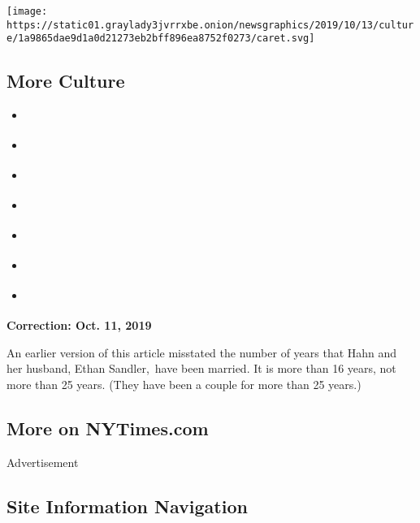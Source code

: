 \protect\hyperlink{}{} \protect\hyperlink{}{}

\texttt{[image: https://static01.graylady3jvrrxbe.onion/newsgraphics/2019/10/13/culture/1a9865dae9d1a0d21273eb2bff896ea8752f0273/caret.svg]}

\hypertarget{more-culture}{%
\subsection{More Culture}\label{more-culture}}

\begin{itemize}
\tightlist
\item
  \href{https://www.nytimes3xbfgragh.onion/interactive/2019/10/09/magazine/tyler-perry-black-theater.html}{}
\item
  \href{https://www.nytimes3xbfgragh.onion/interactive/2019/10/09/magazine/PewDiePie-interview.html}{}
\item
  \href{https://www.nytimes3xbfgragh.onion/interactive/2019/10/08/magazine/black-women-artists-conversation.html}{}
\item
  \href{https://www.nytimes3xbfgragh.onion/interactive/2019/10/08/magazine/rosalia-flamenco.html}{}
\item
  \href{https://www.nytimes3xbfgragh.onion/interactive/2019/10/08/magazine/ben-lerner-topeka-school.html}{}
\item
  \href{https://www.nytimes3xbfgragh.onion/interactive/2019/10/08/magazine/susan-sontag.html}{}
\item
  \href{https://www.nytimes3xbfgragh.onion/interactive/2019/10/09/magazine/moma-reopening.html}{}
\end{itemize}

\textbf{Correction: Oct. 11, 2019}

An earlier version of this article misstated the number of years that
Hahn and her husband, Ethan Sandler,~have been married. It is more than
16 years, not more than 25 years. (They have been a couple for more than
25 years.)

\hypertarget{more-on-nytimescom}{%
\subsection{More on NYTimes.com}\label{more-on-nytimescom}}

Advertisement

\hypertarget{site-information-navigation}{%
\subsection{Site Information
Navigation}\label{site-information-navigation}}

